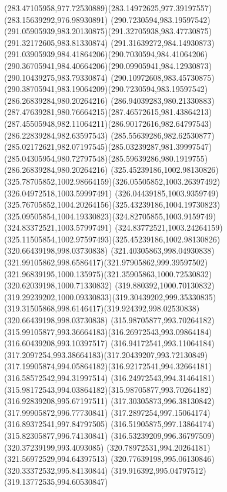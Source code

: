 {{\curveto(283.47105958,977.72530889)(283.14972625,977.39197557)(283.15639292,976.98930891)
\moveto(290.7230594,983.19597542)
\curveto(291.05905939,983.20130875)(291.32705938,983.47730875)(291.32172605,983.81330874)
\curveto(291.31639272,984.14930873)(291.03905939,984.41864206)(290.7030594,984.41064206)
\curveto(290.36705941,984.40664206)(290.09905941,984.12930873)(290.10439275,983.79330874)
\curveto(290.10972608,983.45730875)(290.38705941,983.19064209)(290.7230594,983.19597542)
\moveto(286.26839284,980.20264216)
\curveto(286.94039283,980.21330883)(287.47639281,980.76664215)(287.46572615,981.43864213)
\curveto(287.45505948,982.11064211)(286.90172616,982.64797543)(286.22839284,982.63597543)
\curveto(285.55639286,982.62530877)(285.02172621,982.07197545)(285.03239287,981.39997547)
\curveto(285.04305954,980.72797548)(285.59639286,980.1919755)(286.26839284,980.20264216)
\moveto(325.45239186,1002.98130826)
\curveto(325.78705852,1002.98664159)(326.05505852,1003.26397492)(326.04972518,1003.59997491)
\curveto(326.04439185,1003.9359749)(325.76705852,1004.20264156)(325.43239186,1004.19730823)
\curveto(325.09505854,1004.19330823)(324.82705855,1003.9159749)(324.83372521,1003.57997491)
\curveto(324.83772521,1003.24264159)(325.11505854,1002.97597493)(325.45239186,1002.98130826)
\moveto(320.66439198,998.03730838)
\curveto(321.40305863,998.04930838)(321.99105862,998.6586417)(321.97905862,999.39597502)
\curveto(321.96839195,1000.135975)(321.35905863,1000.72530832)(320.62039198,1000.71330832)
\curveto(319.880392,1000.70130832)(319.29239202,1000.09330833)(319.30439202,999.35330835)
\curveto(319.31505868,998.6146417)(319.924392,998.02530838)(320.66439198,998.03730838)
\moveto(315.98705877,993.70264182)
\curveto(315.99105877,993.36664183)(316.26972543,993.09864184)(316.60439208,993.10397517)
\curveto(316.94172541,993.11064184)(317.2097254,993.38664183)(317.20439207,993.72130849)
\curveto(317.19905874,994.05864182)(316.92172541,994.32664181)(316.58572542,994.31997514)
\curveto(316.24972543,994.31464181)(315.98172543,994.03864182)(315.98705877,993.70264182)
\moveto(316.92839208,995.67197511)
\lineto(317.30305873,996.38130842)
\lineto(317.99905872,996.77730841)
\lineto(317.2897254,997.15064174)
\lineto(316.89372541,997.84797505)
\lineto(316.51905875,997.13864174)
\lineto(315.82305877,996.74130841)
\lineto(316.53239209,996.36797509)
\closepath
\moveto(320.37239199,993.4093085)
\lineto(320.78972531,994.20264181)
\lineto(321.56972529,994.64397513)
\lineto(320.77639198,995.06130846)
\lineto(320.33372532,995.84130844)
\lineto(319.916392,995.04797512)
\lineto(319.13772535,994.60530847)
}}
